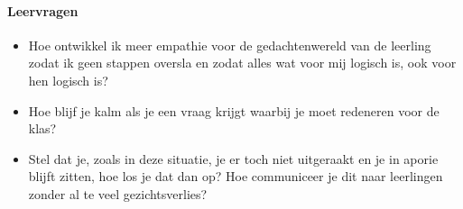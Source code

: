 \documentclass[a4paper,11pt]{article}
\theoremstyle{definition}
\begin{document}
\paragraph*{Leervragen}
\begin{itemize}
  \item Hoe ontwikkel ik meer empathie voor de gedachtenwereld van de leerling zodat ik geen stappen oversla en zodat alles wat voor mij logisch is, ook voor hen logisch is?
  \item Hoe blijf je kalm als je een vraag krijgt waarbij je moet redeneren voor de klas?
\item Stel dat je, zoals in deze situatie, je er toch niet uitgeraakt en je in aporie blijft zitten, hoe los je dat dan op? Hoe communiceer je dit naar leerlingen zonder al te veel gezichtsverlies?
\end{itemize}
\end{document}
